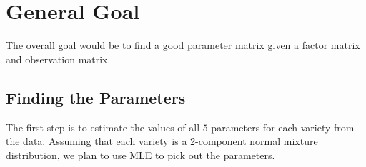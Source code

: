 \documentclass[12pt]{amsart}
\theoremstyle{plain}
\theoremstyle{definition}
\begin{document}


\section{General Goal}

The overall goal would be to find a good parameter matrix given a factor matrix and observation matrix.

\subsection{Finding the Parameters}

The first step is to estimate the values of all $5$ parameters for each variety from the data.
Assuming that each variety is a 2-component normal mixture distribution, we plan to use MLE to pick out the parameters.


\end{document}
